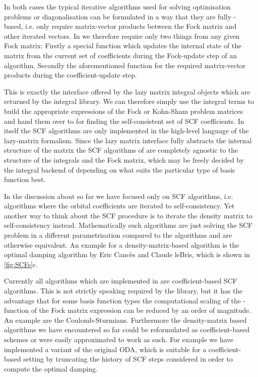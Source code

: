 In both cases the typical iterative algorithms used for
solving optimisation problems or diagonalisation
can be formulated in a way that they are fully \contraction-based,
i.e. only require matrix-vector products between the Fock matrix
and other iterated vectors.
In \gscf we therefore require only two things from any given Fock matrix:
Firstly a special \update function which updates the internal state of
the matrix from the current set of coefficients
during the Fock-update step of an algorithm.
Secondly the aforementioned \contraction function for the
required matrix-vector products
during the coefficient-update step.

This is exactly the interface offered by the lazy matrix integral objects
which are returned by the \gint integral library.
We can therefore simply use the \gint integral terms to build the appropriate expressions
of the Fock or Kohn-Sham problem matrices
and hand them over to \gscf for finding the self-consistent set of SCF coefficients.
In \gscf itself the SCF algorithms are only implemented in the
high-level language of the lazy-matrix formalism.
Since the lazy matrix interface fully abstracts the internal structure of the matrix
the SCF algorithms of \gscf
are completely agnostic to the structure of the integrals and the Fock matrix,
which may be freely decided by the integral backend of \gint
depending on what suits the particular type of basis function best.

In the discussion about \gscf so far we have focused only on
 SCF algorithms,
i.e. algorithms where the orbital coefficients are iterated to self-consistency.
Yet another way to think about the SCF procedure is to iterate the
density matrix to self-consistency instead.
Mathematically such  algorithms
are just solving the SCF problem in a different parametrisation
compared to the  algorithms
and are otherwise equivalent.
An example for a density-matrix-based algorithm is the optimal damping algorithm
by Eric Cancès and Claude leBris,
which is shown in \fig \ref{fig:SCFs}c.

Currently all algorithms which are implemented in \gscf are coefficient-based SCF algorithms.
This is not strictly speaking required by the library,
but it has the advantage that for some basis function types
the computational scaling of the \contraction-function
of the Fock matrix expression can be reduced by an order of magnitude.
An example are the Coulomb-Sturmians.
Furthermore the density-matrix based algorithms
we have encountered so far could be reformulated as coefficient-based schemes
or were easily approximated to work as such.
For example we have implemented a variant of the original ODA,
which is suitable for a coefficient-based setting by truncating
the history of SCF steps considered in order to compute the optimal damping.

